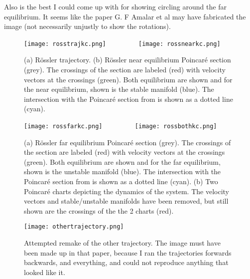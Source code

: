 \begin{description}
Also  is the best I could come up with for showing
circling around the far equilibrium.  It seems like the paper G. F Amalar
et al may have fabricated the image (not necessarily unjustly to show the
rotations).

 \begin{figure}%
 \begin{center}
\texttt{[image: rosstrajkc.png]}%
~~~~~~~~
\texttt{[image: rossnearkc.png]}%
 \end{center}
 \caption{
(a)
R\"ossler trajectory.
(b)
R\"ossler near equilibrium Poincar\'e section (grey).  The crossings of
the section are labeled (red) with velocity vectors at the crossings
(green).  Both equilibrium are shown and for the near equilibrium, shown
is the stable manifold (blue). The intersection with the Poincar\'e
section from  is shown as a dotted line (cyan).
    }{\label{fig:RossRedone}}
 \end{figure}

 \begin{figure}%
 \begin{center}
\texttt{[image: rossfarkc.png]}%
~~~~~~~~
\texttt{[image: rossbothkc.png]}%
 \end{center}
 \caption{
(a)
R\"ossler far equilibrium Poincar\'e section (grey).  The crossings of
the section are labeled (red) with velocity vectors at the crossings
(green).  Both equilibrium are shown and for the far equilibrium, shown
is the unstable manifold (blue).  The intersection with the Poincar\'e
section from  is shown as a dotted line (cyan).
(b)
Two Poincar\'e charts depicting the dynamics of the system.  The velocity
vectors and stable/unstable manifolds have been removed, but still shown
are the crossings of the the 2 charts (red).
    }{\label{fig:RossRedone2}}
 \end{figure}


 \begin{figure}%
 \begin{center}
\texttt{[image: othertrajectory.png]}%

 \end{center}
 \caption{
Attempted remake of the other trajectory.  The image must have been made
up in that paper, because I ran the trajectories forwards backwards, and
everything, and could not reproduce anything that looked like it.
}{\label{fig:othertraj}}
 \end{figure}


\end{description}
